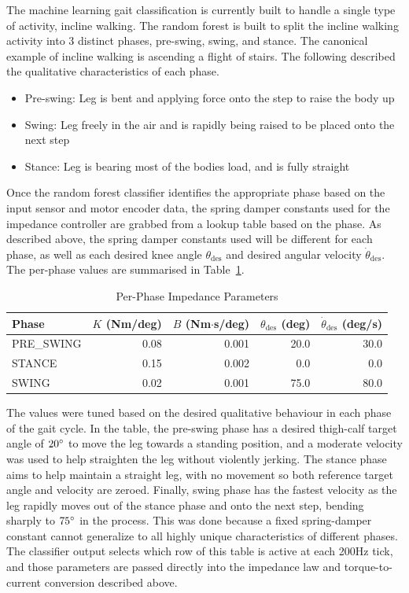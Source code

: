 \documentclass[11pt]{article}
\begin{document}
The machine learning gait classification is currently built to handle a single type of activity, incline walking. 
The random forest is built to split the incline walking activity into 3 distinct phases, pre-swing, swing, and stance. 
The canonical example of incline walking is ascending a flight of stairs. The following described the qualitative characteristics 
of each phase.

\begin{itemize}
    \item Pre-swing: Leg is bent and applying force onto the step to raise the body up
    \item Swing: Leg freely in the air and is rapidly being raised to be placed onto the next step
    \item Stance: Leg is bearing most of the bodies load, and is fully straight 
\end{itemize}

Once the random forest classifier identifies the appropriate phase based on the input sensor and motor encoder data,
the spring damper constants used for the impedance controller are grabbed from a lookup table based on the phase. As described
above, the spring damper constants used will be different for each phase, as well as each desired knee angle $\theta_\text{des}$ and desired angular velocity $\dot{\theta}_\text{des}$. The per-phase values are summarised in Table~\ref{tab:phase_params}.

\begin{table}[H]
\centering
\caption{Per-Phase Impedance Parameters}
\label{tab:phase_params}
\begin{tabular}{lrrrr}
\toprule
\textbf{Phase} & \textbf{$K$ (Nm/deg)} & \textbf{$B$ (Nm$\cdot$s/deg)} & \textbf{$\theta_\text{des}$ (deg)} & \textbf{$\dot{\theta}_\text{des}$ (deg/s)} \\
\midrule
PRE\_SWING & 0.08 & 0.001 & 20.0 & 30.0 \\
STANCE     & 0.15 & 0.002 &  0.0 &  0.0 \\
SWING      & 0.02 & 0.001 & 75.0 & 80.0 \\
\bottomrule
\end{tabular}
\end{table}

The values were tuned based on the desired qualitative behaviour in each phase of the gait cycle. In the table, 
the pre-swing phase has a desired thigh-calf target angle of $20 \degree$ to move the leg towards a standing position, 
and a moderate velocity was used to help straighten the leg without violently jerking. The stance phase aims to help 
maintain a straight leg, with no movement so both reference target angle and velocity are zeroed. Finally, swing phase has 
the fastest velocity as the leg rapidly moves out of the stance phase and onto the next step, bending sharply to $75 \degree$ 
in the process. This was done because a fixed spring-damper constant cannot generalize to all highly unique characteristics of
different phases. The classifier output selects which row of this table is active at each 200Hz tick, and those parameters are passed directly into the impedance law and torque-to-current conversion described above.
\end{document}

